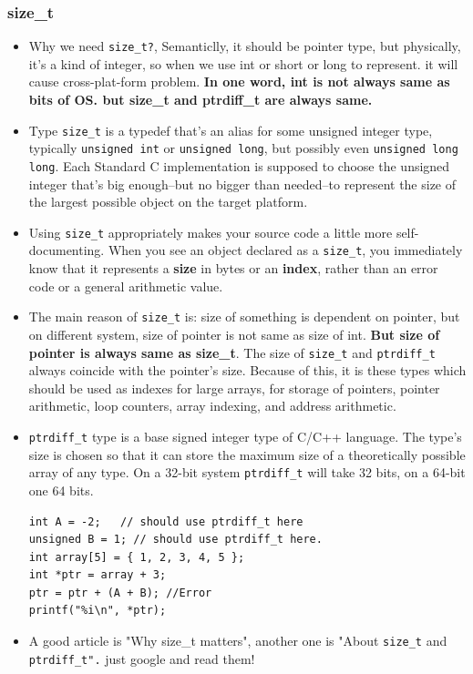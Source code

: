 \documentclass[a4paper,11pt,twoside]{book}
\begin{document}
\subsubsection{size\_t}
\begin{itemize}
	\item Why we need \texttt{size\_t?}, Semanticlly, it should be pointer type, but physically, it's a kind of integer, so when we use int or short or long to represent. it will cause cross-plat-form problem. \textbf{In one word, int is not always same as bits of OS. but size\_t and ptrdiff\_t are always same.}

	\item Type \texttt{size\_t} is a typedef that's an alias for some unsigned integer type, typically \texttt{unsigned int} or \texttt{unsigned long}, but possibly even \texttt{unsigned long long}. Each Standard C implementation is supposed to choose the unsigned integer that's big enough--but no bigger than needed--to represent the size of the largest possible object on the target platform.
	
	\item Using \texttt{size\_t} appropriately makes your source code a little more self-documenting. When you see an object declared as a \texttt{size\_t}, you immediately know that it represents a \textbf{size} in bytes or an \textbf{index}, rather than an error code or a general arithmetic value.
	
	\item The main reason of \texttt{size\_t} is: size of something is dependent on pointer, but on different system, size of pointer is not same as size of int.  \textbf{But size of pointer is always same as size\_t}. The size of \texttt{size\_t} and \texttt{ptrdiff\_t} always coincide with the pointer's size. Because of this, it is these types which should be used as indexes for large arrays, for storage of pointers, pointer arithmetic, loop counters, array indexing, and address arithmetic.
	
	\item \texttt{ptrdiff\_t} type is a base signed integer type of C/C++ language. The type's size is chosen so that it can store the maximum size of a theoretically possible array of any type. On a 32-bit system \texttt{ptrdiff\_t} will take 32 bits, on a 64-bit one 64 bits.
\begin{lstlisting}[numbers=none]
int A = -2;   // should use ptrdiff_t here
unsigned B = 1; // should use ptrdiff_t here.
int array[5] = { 1, 2, 3, 4, 5 };
int *ptr = array + 3;
ptr = ptr + (A + B); //Error
printf("%i\n", *ptr);
\end{lstlisting}
	
	\item A good article is "Why size\_t matters", another one is "About \texttt{size\_t} and \texttt{ptrdiff\_t".} just google and read them!   
\end{itemize}
\end{document}
